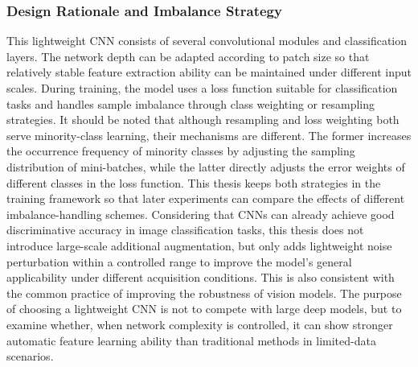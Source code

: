 \subsubsection{Design Rationale and Imbalance Strategy}
\par This lightweight CNN consists of several convolutional modules and
classification layers. The network depth can be adapted according to patch size
so that relatively stable feature extraction ability can be maintained under
different input scales. During training, the model uses a loss function
suitable for classification tasks and handles sample imbalance through class
weighting or resampling strategies. It should be noted that although resampling
and loss weighting both serve minority-class learning, their mechanisms are
different. The former increases the occurrence frequency of minority classes by
adjusting the sampling distribution of mini-batches, while the latter directly
adjusts the error weights of different classes in the loss function. This
thesis keeps both strategies in the training framework so that later
experiments can compare the effects of different imbalance-handling schemes.
Considering that CNNs can already achieve good discriminative accuracy in image
classification tasks, this thesis does not introduce large-scale additional
augmentation, but only adds lightweight noise perturbation within a controlled
range to improve the model's general applicability under different acquisition
conditions. This is also consistent with the common practice of improving the
robustness of vision models. The purpose of choosing a lightweight CNN is not
to compete with large deep models, but to examine whether, when network
complexity is controlled, it can show stronger automatic feature learning
ability than traditional methods in limited-data scenarios.

